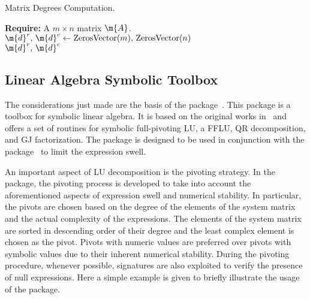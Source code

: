 \begin{breakablealgorithm}
  \caption{Matrix Degrees Computation.}
  \label{chap3:alg:compute_degrees}
  \begin{algorithmic}[1]
    \State \textbf{Require:} A $m \times n$ matrix $\m{A}$.
     
    \State $\m{d}^r, \, \m{d}^c \gets \mathrm{ZerosVector}(m), \, \mathrm{ZerosVector}(n)$ 
     
       
         
      \EndFor
    \EndFor
     
       
         
      \EndFor
    \EndFor \\
    \Return $\m{d}^r, \, \m{d}^c$ 
    \EndProcedure
  \end{algorithmic}
\end{breakablealgorithm}

\subsection{Linear Algebra Symbolic Toolbox}

The considerations just made are the basis of the \LAST{} package~\cite{last}. This package is a \Maple{} toolbox for symbolic linear algebra. It is based on the original works in~\cite{carette2006linear,zhou2008fraction} and offers a set of routines for symbolic full-pivoting \ac{LU}, a \ac{FFLU}, QR decomposition, and \ac{GJ} factorization. The package \LAST{} is designed to be used in conjunction with the \LEM{} package~\cite{lem} to limit the expression swell.

An important aspect of \ac{LU} decomposition is the pivoting strategy. In the \LAST{} package, the pivoting process is developed to take into account the aforementioned aspects of expression swell and numerical stability. In particular, the pivots are chosen based on the degree of the elements of the system matrix and the actual complexity of the expressions. The elements of the system matrix are sorted in descending order of their degree and the least complex element is chosen as the pivot. Pivots with numeric values are preferred over pivots with symbolic values due to their inherent numerical stability. During the pivoting procedure, whenever possible, signatures are also exploited to verify the presence of null expressions. Here a simple example is given to briefly illustrate the usage of the \LAST{} package.

